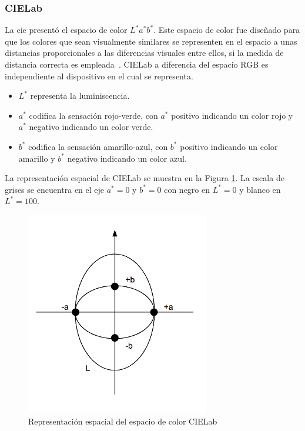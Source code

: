 \subsubsection{CIELab}
La \gls{cie} presentó el espacio de color $L^*a^*b^*$. Este espacio de color fue diseñado para que los colores que sean visualmente similares se representen en el espacio a unas distancias proporcionales a las diferencias visuales entre ellos, si la medida de distancia correcta es empleada~\cite{hanbury2001mathematical}. CIELab a diferencia del espacio RGB es independiente al dispositivo en el cual se representa.

\begin{itemize}
\item $L^*$ representa la luminiscencia.
\item $a^*$ codifica la sensación rojo-verde, con $a^*$ positivo indicando un color rojo y $a^*$ negativo indicando un color verde.
\item $b^*$ codifica la sensación amarillo-azul, con $b^*$ positivo indicando un color amarillo y $b^*$ negativo indicando un color azul.
\end{itemize}
La representación espacial de CIELab se muestra en la Figura \ref{img:cielab-diagrama}. La escala de grises se encuentra en el eje $a^*=0$ y $b^*=0$ con negro en $L^*=0$ y blanco en $L^*=100$.

\begin{figure}[h!]
\centering
\includegraphics[width=80mm]{./figuras/diagrama-cielab.png}
\caption{Representación espacial del espacio de color CIELab}
\label{img:cielab-diagrama}
\end{figure}

